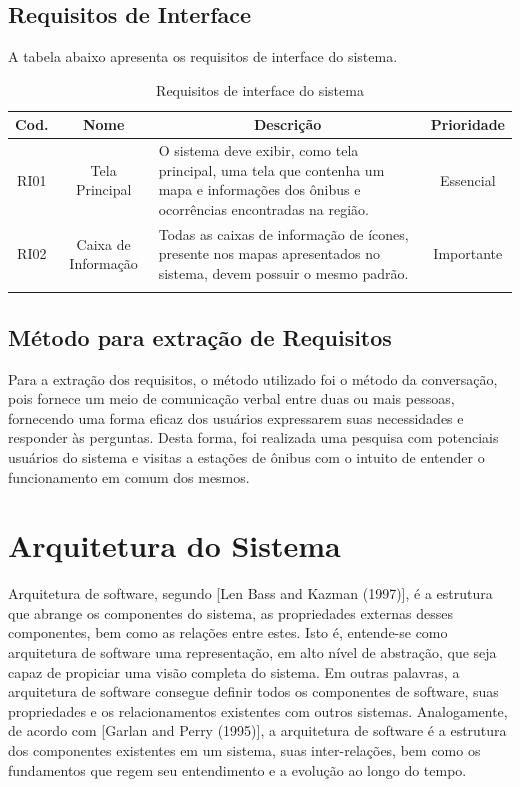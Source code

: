 \subsection{Requisitos de Interface}

A tabela abaixo apresenta os requisitos de interface do sistema.

\begin{center}
\begin{longtable}{c|c|p{8cm}|c}
\hline
    \multicolumn{1}{c}{\textbf{Cod.}} & \multicolumn{1}{c}{\textbf{Nome}} & \multicolumn{1}{c}{\textbf{Descrição}} & \textbf{Prioridade} \\
\hline
    RI01  & Tela Principal & O sistema deve exibir, como tela principal, uma tela que contenha um mapa e informações dos ônibus e ocorrências encontradas na região.  & Essencial \\
    \hline
    RI02  & Caixa de Informação & Todas as caixas de informação de ícones, presente nos mapas apresentados no sistema, devem possuir o mesmo padrão. & Importante \\
    \hline
\caption{Requisitos de interface do sistema}
\end{longtable}
\end{center}

\subsection{Método para extração de Requisitos}

Para a extração dos requisitos, o método utilizado foi o método da conversação, pois fornece um meio de comunicação verbal entre duas ou mais pessoas, fornecendo uma forma eficaz dos usuários expressarem suas necessidades e responder às perguntas. Desta forma, foi realizada uma pesquisa com potenciais usuários do sistema  e visitas a estações de ônibus com o intuito de entender o funcionamento em comum dos mesmos.

\section{Arquitetura do Sistema}
\label{sc:arquitetura}

Arquitetura de software, segundo [Len Bass and Kazman (1997)], é a estrutura que abrange os componentes do sistema, as propriedades externas desses componentes, bem como as relações entre estes. Isto é, entende-se como arquitetura de software uma representação, em alto nível de abstração, que seja capaz de propiciar uma visão completa do sistema. Em outras palavras, a arquitetura de software consegue definir todos os componentes de software, suas propriedades e os relacionamentos existentes com outros sistemas. Analogamente, de acordo com [Garlan and Perry (1995)], a arquitetura de software é a estrutura dos componentes existentes em um sistema, suas inter-relações, bem como os fundamentos que regem seu entendimento e a evolução ao longo do tempo.

